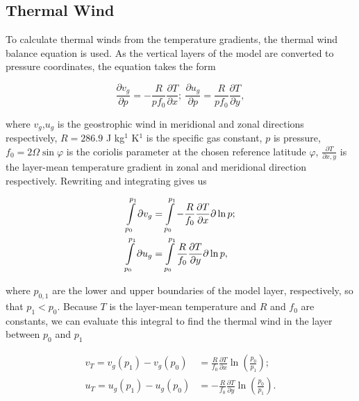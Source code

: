 \subsection{Thermal Wind}
To calculate thermal winds from the temperature gradients, the thermal wind balance equation is used. As the vertical layers of the model are converted to pressure coordinates, the equation takes the form 

\begin{equation}
    \frac{\partial v_g}{\partial p} = - \frac{R}{pf_0} \frac{\partial T}{\partial x};\ 
    \frac{\partial u_g}{\partial p} = \frac{R}{pf_0} \frac{\partial T}{\partial y},
\end{equation}

where $v_g$,$u_g$ is the geostrophic wind in meridional and zonal directions respectively, $R = 286.9$ J kg$^{1}$ K$^{1}$ is the specific gas constant, $p$ is pressure, $f_0 = 2\Omega \sin \varphi$ is the coriolis parameter at the chosen reference latitude $\varphi$, $\frac{\partial T}{\partial x,y}$ is the layer-mean temperature gradient in zonal and meridional direction respectively. Rewriting and integrating gives us

\begin{equation}
    \begin{split}
        \int\displaylimits_{p_0}^{p_1} \partial v_g &= \int\displaylimits_{p_0}^{p_1} - \frac{R}{f_0} \frac{\partial T}{\partial x} \partial \ln p; \\
        \int\displaylimits_{p_0}^{p_1} \partial u_g &= \int\displaylimits_{p_0}^{p_1} \frac{R}{f_0} \frac{\partial T}{\partial y} \partial \ln p,
    \end{split}
\end{equation}

where $p_{0,1}$ are the lower and upper boundaries of the model layer, respectively, so that $p_1 < p_0$. Because $T$ is the layer-mean temperature and $R$ and $f_0$ are constants, we can evaluate this integral to find the thermal wind in the layer between $p_0$ and $p_1$

\begin{equation}
    \begin{split}
        v_T = v_g(p_1) - v_g(p_0) &= \frac{R}{f_0} \frac{\partial T}{\partial x} \ln\left(\frac{p_0}{p_1}\right);\\
        u_T = u_g(p_1) - u_g(p_0) &= - \frac{R}{f_0} \frac{\partial T}{\partial y} \ln\left(\frac{p_0}{p_1}\right).
    \end{split}
\end{equation}

